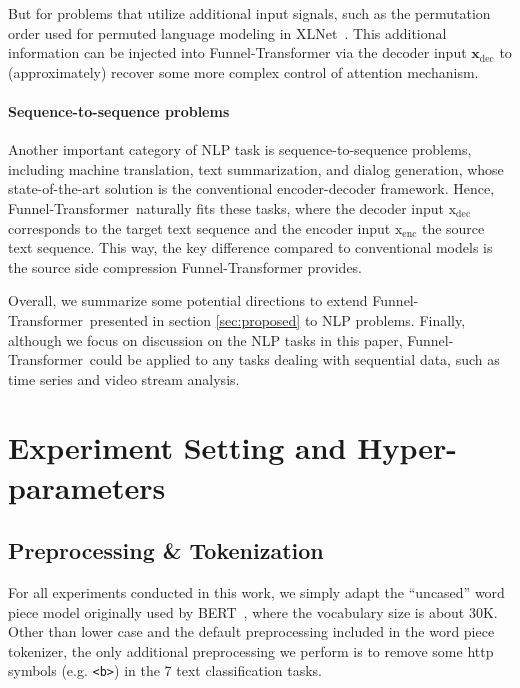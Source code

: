 \documentclass{article}
\theoremstyle{custom}
\def\rvx{{\mathbf{x}}}
\newcommand{\name}{Funnel-Transformer~}
\begin{document}
But for problems that utilize additional input signals, such as the permutation order used for permuted language modeling in XLNet~\cite{yang2019xlnet}.
This additional information can be injected into Funnel-Transformer via the decoder input $\rvx_\text{dec}$ to (approximately) recover some more complex control of attention mechanism.

\paragraph{Sequence-to-sequence problems} Another important category of NLP task is sequence-to-sequence problems, including machine translation, text summarization, and dialog generation, whose state-of-the-art solution is the conventional encoder-decoder framework.
Hence, \name naturally fits these tasks, where the decoder input $\text{x}_\text{dec}$ corresponds to the target text sequence and the encoder input $\text{x}_\text{enc}$ the source text sequence.
This way, the key difference compared to conventional models is the source side compression Funnel-Transformer provides.

Overall, we summarize some potential directions to extend \name presented in section \ref{sec:proposed} to NLP problems.
Finally, although we focus on discussion on the NLP tasks in this paper, \name  could be applied to any tasks dealing with sequential data, such as time series and video stream analysis.


\section{Experiment Setting and Hyper-parameters}
\label{sec:appendix-hparam}
\subsection{Preprocessing \& Tokenization}
For all experiments conducted in this work, we simply adapt the ``uncased'' word piece model originally used by BERT~\cite{devlin2018bert}, where the vocabulary size is about 30K.
Other than lower case and the default preprocessing included in the word piece tokenizer, the only additional preprocessing we perform is to remove some http symbols (e.g. \texttt{<b>}) in the 7 text classification tasks.
\end{document}
